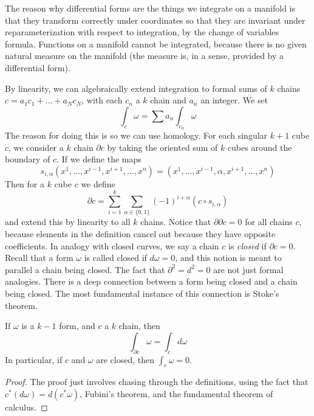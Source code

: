 The reason why differential forms are the things we integrate on a manifold is that they transform correctly under coordinates so that they are invariant under reparameterization with respect to integration, by the change of variables formula. Functions on a manifold cannot be integrated, because there is no given natural measure on the manifold (the measure is, in a sense, provided by a differential form).

By linearity, we can algebraically extend integration to formal sums of $k$ chains $c = a_1 c_1 + \dots + a_N c_N$, with each $c_n$ a $k$ chain and $a_n$ an integer. We set
%
\[ \int_c \omega = \sum a_n \int_{c_n} \omega \]
%
The reason for doing this is so we can use homology. For each singular $k+1$ cube $c$, we consider a $k$ chain $\partial c$ by taking the oriented sum of $k$ cubes around the boundary of $c$. If we define the maps
%
\[ s_{i,\alpha}(x^1, \dots, x^{i-1}, x^{i+1}, \dots, x^n) = (x^1, \dots, x^{i-1}, \alpha, x^{i+1}, \dots, x^n) \]
%
Then for a $k$ cube $c$ we define
%
\[ \partial c = \sum_{i = 1}^k \sum_{\alpha \in \{ 0, 1 \}} (-1)^{i + \alpha} (c \circ s_{i,\alpha}) \]
%
and extend this by linearity to all $k$ chains. Notice that $\partial \partial c = 0$ for all chains $c$, because elements in the definition cancel out because they have opposite coefficients. In analogy with closed curves, we say a chain $c$ is \emph{closed} if $\partial c = 0$. Recall that a form $\omega$ is called closed if $d\omega = 0$, and this notion is meant to parallel a chain being closed. The fact that $\partial^2 = d^2 = 0$ are not just formal analogies. There is a deep connection between a form being closed and a chain being closed. The most fundamental instance of this connection is Stoke's theorem.

\begin{theorem}
    If $\omega$ is a $k-1$ form, and $c$ a $k$ chain, then
    \[ \int_{\partial c} \omega =  \int_c d \omega \]
    In particular, if $c$ and $\omega$ are closed, then $\int_c \omega = 0$.
\end{theorem}
\begin{proof}
    The proof just involves chasing through the definitions, using the fact that $c^*(d \omega) = d(c^* \omega)$, Fubini's theorem, and the fundamental theorem of calculus.
\end{proof}

